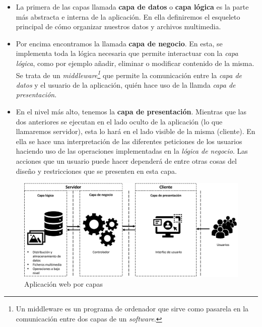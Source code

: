 \documentclass[../main.tex]{subfiles}
\begin{document}
    \begin{itemize}
        \item La primera de las capas llamada \textbf{capa de datos} o \textbf{capa lógica} es la parte más abstracta e interna de la aplicación. En ella definiremos el esqueleto principal de cómo organizar nuestros datos y archivos multimedia.
        
        \item Por encima encontramos la llamada \textbf{capa de negocio}. En esta, se implementa toda la lógica necesaria que permite interactuar con la \textit{capa lógica}, como por ejemplo añadir, eliminar o modificar contenido de la misma. Se trata de un \textit{middleware\footnote{Un middleware es un programa de ordenador que sirve como pasarela en la comunicación entre dos capas de un \textit{software}.}} que permite la comunicación entre la \textit{capa de datos} y el usuario de la aplicación, quién hace uso de la llamda \textit{capa de presentación}.
        
        \item En el nivel más alto, tenemos la \textbf{capa de presentación}. Mientras que las dos anteriores se ejecutan en el lado oculto de la aplicación (lo que llamaremos servidor), esta lo hará en el lado visible de la misma (cliente). En ella se hace una interpretación de las diferentes peticiones de los usuarios haciendo uso de las operaciones implementadas en la \textit{lógica de negocio}. Las acciones que un usuario puede hacer dependerá de entre otras cosas del diseño y restricciones que se presenten en esta capa.
        
        
      
    \end{itemize}
    
    \begin{figure}[!h]
          \centering
          \includegraphics[width=\textwidth]{images/estructura_aplicacion_web.png}
          \caption{Aplicación web por capas}
          \label{fig:web_capas}
      \end{figure}
      
\end{document}
